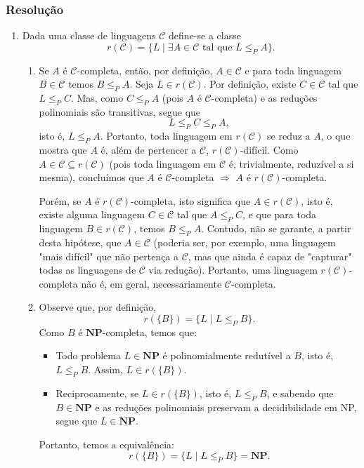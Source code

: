\documentclass[a4paper,12pt]{article}
\begin{document}
\subsubsection*{Resolução}
\begin{enumerate}[label=\alph*)]
  \item Dada uma classe de linguagens $\mathcal{C}$ define-se a classe
  \[
  r(\mathcal{C}) = \{ L \mid \exists A \in \mathcal{C} \text{ tal que } L \leq_P A \}.
  \]

  \begin{enumerate}[label=(\roman*)]
    \item Se $A$ é $\mathcal{C}$-completa, então, por definição, $A \in \mathcal{C}$ e para toda linguagem $B \in \mathcal{C}$ temos $B \leq_P A$.  
    Seja $L \in r(\mathcal{C})$. Por definição, existe $C \in \mathcal{C}$ tal que $L \leq_P C$.  
    Mas, como $C \leq_P A$ (pois $A$ é $\mathcal{C}$-completa) e as reduções polinomiais são transitivas, segue que
    \[
    L \leq_P C \leq_P A,
    \]
    isto é, $L \leq_P A$. Portanto, toda linguagem em $r(\mathcal{C})$ se reduz a $A$, o que mostra que $A$ é, além de pertencer a $\mathcal{C}$, $r(\mathcal{C})$-difícil.  
    Como $A \in \mathcal{C} \subseteq r(\mathcal{C})$ (pois toda linguagem em $\mathcal{C}$ é, trivialmente, reduzível a si mesma), concluímos que $A$ é $\mathcal{C}$-completa $\Rightarrow$ $A$ é $r(\mathcal{C})$-completa.
    
    \vspace{0.3cm}
    Porém, se $A$ é $r(\mathcal{C})$-completa, isto significa que $A \in r(\mathcal{C})$, isto é, existe alguma linguagem $C \in \mathcal{C}$ tal que $A \leq_P C$, e que para toda linguagem $B \in r(\mathcal{C})$, temos $B \leq_P A$.  
    Contudo, não se garante, a partir desta hipótese, que $A \in \mathcal{C}$ (poderia ser, por exemplo, uma linguagem "mais difícil" que não pertença a $\mathcal{C}$, mas que ainda é capaz de "capturar" todas as linguagens de $\mathcal{C}$ via redução).  
    Portanto, uma linguagem $r(\mathcal{C})$-completa não é, em geral, necessariamente $\mathcal{C}$-completa.
    
    \vspace{0.5cm}
    \item Observe que, por definição,
    \[
    r(\{B\}) = \{ L \mid L \leq_P B \}.
    \]
    Como $B$ é $\mathbf{NP}$-completa, temos que:
    \begin{itemize}
      \item Todo problema $L \in \mathbf{NP}$ é polinomialmente redutível a $B$, isto é, $L \leq_P B$. Assim, $L \in r(\{B\})$.  
      \item Reciprocamente, se $L \in r(\{B\})$, isto é, $L \leq_P B$, e sabendo que $B \in \mathbf{NP}$ e as reduções polinomiais preservam a decidibilidade em NP, segue que $L \in \mathbf{NP}$.
    \end{itemize}
    Portanto, temos a equivalência:
    \[
    r(\{B\}) = \{ L \mid L \leq_P B \} = \mathbf{NP}.
    \]
    

\end{enumerate}
\end{enumerate}
\end{document}
